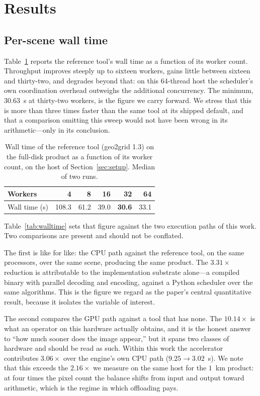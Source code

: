 \documentclass[11pt]{article}
\begin{document}
\section{Results}
\label{sec:results}

\subsection{Per-scene wall time}
\label{sec:walltime}

Table~\ref{tab:sweep} reports the reference tool's wall time as a function of
its worker count. Throughput improves steeply up to sixteen workers, gains
little between sixteen and thirty-two, and degrades beyond that: on this
64-thread host the scheduler's own coordination overhead outweighs the
additional concurrency. The minimum, $30.63$~s at thirty-two workers, is the
figure we carry forward. We stress that this is more than three times faster
than the same tool at its shipped default, and that a comparison omitting this
sweep would not have been wrong in its arithmetic---only in its conclusion.

\begin{table}[t]
\caption{Wall time of the reference tool (geo2grid 1.3) on the full-disk
product as a function of its worker count, on the host of
Section~\ref{sec:setup}. Median of two runs.}\label{tab:sweep}
\centering
\begin{tabular}{lrrrrr}
\toprule
Workers & 4 & 8 & 16 & 32 & 64 \\
\midrule
Wall time (s) & 108.3 & 61.2 & 39.0 & \textbf{30.6} & 33.1 \\
\bottomrule
\end{tabular}
\end{table}

Table~\ref{tab:walltime} sets that figure against the two execution paths of
this work. Two comparisons are present and should not be conflated.

The first is like for like: the CPU path against the reference tool, on the
same processors, over the same scene, producing the same product. The
$3.31\times$ reduction is attributable to the implementation substrate alone---a
compiled binary with parallel decoding and encoding, against a Python
scheduler over the same algorithms. This is the figure we regard as the
paper's central quantitative result, because it isolates the variable of
interest.

The second compares the GPU path against a tool that has none. The
$10.14\times$ is what an operator on this hardware actually obtains, and it is
the honest answer to ``how much sooner does the image appear,'' but it spans
two classes of hardware and should be read as such. Within this work the
accelerator contributes $3.06\times$ over the engine's own CPU path
($9.25 \rightarrow 3.02$~s). We note that this exceeds the $2.16\times$ we
measure on the same host for the $1$~km product: at four times the pixel count
the balance shifts from input and output toward arithmetic, which is the
regime in which offloading pays.
\end{document}
